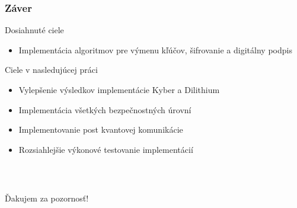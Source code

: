 \documentclass[%
  14pt,       				%
	t,                  %
	aspectratio=1610,   %
	unicode,						%
]{beamer}				    	%
\begin{document}
\begin{frame}[c]
	\frametitle{Záver}
	\large{
		Dosiahnuté ciele
		\begin{itemize}
			\item Implementácia algoritmov pre výmenu kľúčov, šifrovanie a digitálny podpis
		\end{itemize}
		Ciele v nasledujúcej práci
		\begin{itemize}
			\item Vylepšenie výsledkov implementácie Kyber a Dilithium
			\item Implementácia všetkých bezpečnostných úrovní
			\item Implementovanie post kvantovej komunikácie
			\item Rozsiahlejšie výkonové testovanie implementácií
		\end{itemize}
	}

\end{frame}

\begin{frame}[c]
	\frametitle{\mbox{ }}
	\begin{center}
		{\Huge Ďakujem za pozornosť!}
	\end{center}
\end{frame}

\end{document}
